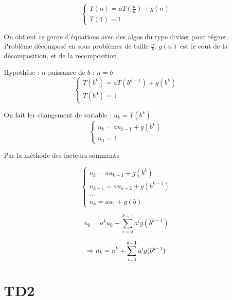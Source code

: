 \begin{exercice}

\[ \begin{cases} T(n)=aT(\frac{n}{n})+g(n) \\ T(1)=1 \end{cases} \]

On obtient ce genre d'équations avec des algos du type diviser pour régner. Problème décomposé en sous problèmes de taille $\frac{n}{b}$. $g(n)$ est le cout de la décomposition, et de la recomposition.

Hypothèse : $n$ puissance de $b$ : $n=b$
\[ \begin{cases} T(b^k)=aT(b^{k-1})+g(b^k) \\ T(b^0)=1 \end{cases} \]

On fait ler changement de variable : $u_k=T(b^k)$
\[ \begin{cases}u_k=au_{k-1}+g(b^k) \\ u_0=1 \end{cases}\]

Par la méthode des facteurs sommants

\[ \begin{cases}
	u_k=au_{k-1}+g(b^k)\\
	u_{k-1}=au_{k-2}+g(b^{k-1})\\
	...\\
	u_k=au_1+g(b)
\end{cases}\]

\[u_k=a^ku_0+\sum_{i=0}^{k-1} a^ig(b^{k-1})\]

\[\Rightarrow u_k=a^k+\sum_{i=0}^{k-1} a^ig(b^{k-1})\]
\end{exercice}

\section{TD2}
